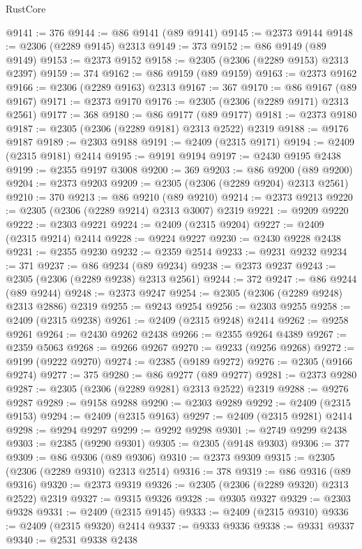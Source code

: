 \begin{lexlean}{RustCore}
\begin{coremodule}
@9141 := 376
@9144 := @86 @9141 (@89 @9141)
@9145 := @2373 @9144
@9148 := @2306 (@2289 @9145) @2313
@9149 := 373
@9152 := @86 @9149 (@89 @9149)
@9153 := @2373 @9152
@9158 := @2305 (@2306 (@2289 @9153) @2313 @2397)
@9159 := 374
@9162 := @86 @9159 (@89 @9159)
@9163 := @2373 @9162
@9166 := @2306 (@2289 @9163) @2313
@9167 := 367
@9170 := @86 @9167 (@89 @9167)
@9171 := @2373 @9170
@9176 := @2305 (@2306 (@2289 @9171) @2313 @2561)
@9177 := 368
@9180 := @86 @9177 (@89 @9177)
@9181 := @2373 @9180
@9187 := @2305 (@2306 (@2289 @9181) @2313 @2522) @2319
@9188 := @9176 @9187
@9189 := @2303 @9188
@9191 := @2409 (@2315 @9171)
@9194 := @2409 (@2315 @9181) @2414
@9195 := @9191 @9194
@9197 := @2430 @9195 @2438
@9199 := @2355 @9197 @3008
@9200 := 369
@9203 := @86 @9200 (@89 @9200)
@9204 := @2373 @9203
@9209 := @2305 (@2306 (@2289 @9204) @2313 @2561)
@9210 := 370
@9213 := @86 @9210 (@89 @9210)
@9214 := @2373 @9213
@9220 := @2305 (@2306 (@2289 @9214) @2313 @3007) @2319
@9221 := @9209 @9220
@9222 := @2303 @9221
@9224 := @2409 (@2315 @9204)
@9227 := @2409 (@2315 @9214) @2414
@9228 := @9224 @9227
@9230 := @2430 @9228 @2438
@9231 := @2355 @9230
@9232 := @2359 @2514
@9233 := @9231 @9232
@9234 := 371
@9237 := @86 @9234 (@89 @9234)
@9238 := @2373 @9237
@9243 := @2305 (@2306 (@2289 @9238) @2313 @2561)
@9244 := 372
@9247 := @86 @9244 (@89 @9244)
@9248 := @2373 @9247
@9254 := @2305 (@2306 (@2289 @9248) @2313 @2886) @2319
@9255 := @9243 @9254
@9256 := @2303 @9255
@9258 := @2409 (@2315 @9238)
@9261 := @2409 (@2315 @9248) @2414
@9262 := @9258 @9261
@9264 := @2430 @9262 @2438
@9266 := @2355 @9264 @4389
@9267 := @2359 @5063
@9268 := @9266 @9267
@9270 := @9233 (@9256 @9268)
@9272 := @9199 (@9222 @9270)
@9274 := @2385 (@9189 @9272)
@9276 := @2305 (@9166 @9274)
@9277 := 375
@9280 := @86 @9277 (@89 @9277)
@9281 := @2373 @9280
@9287 := @2305 (@2306 (@2289 @9281) @2313 @2522) @2319
@9288 := @9276 @9287
@9289 := @9158 @9288
@9290 := @2303 @9289
@9292 := @2409 (@2315 @9153)
@9294 := @2409 (@2315 @9163)
@9297 := @2409 (@2315 @9281) @2414
@9298 := @9294 @9297
@9299 := @9292 @9298
@9301 := @2749 @9299 @2438
@9303 := @2385 (@9290 @9301)
@9305 := @2305 (@9148 @9303)
@9306 := 377
@9309 := @86 @9306 (@89 @9306)
@9310 := @2373 @9309
@9315 := @2305 (@2306 (@2289 @9310) @2313 @2514)
@9316 := 378
@9319 := @86 @9316 (@89 @9316)
@9320 := @2373 @9319
@9326 := @2305 (@2306 (@2289 @9320) @2313 @2522) @2319
@9327 := @9315 @9326
@9328 := @9305 @9327
@9329 := @2303 @9328
@9331 := @2409 (@2315 @9145)
@9333 := @2409 (@2315 @9310)
@9336 := @2409 (@2315 @9320) @2414
@9337 := @9333 @9336
@9338 := @9331 @9337
@9340 := @2531 @9338 @2438

\end{coremodule}
\end{lexlean}
